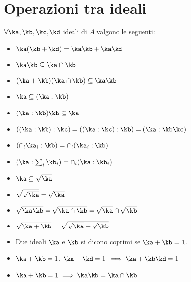 \documentclass[a4paper,NoNotes,GeneralMath]{stdmdoc}
\begin{document}
	\section*{Operazioni tra ideali}
	$\forall \ka, \kb, \kc, \kd$ ideali di $A$ valgono le seguenti:
	\begin{itemize}
		\item $\ka (\kb + \kd) = \ka \kb + \ka \kd$
		\item $\ka \kb \subseteq \ka \cap \kb$
		\item $(\ka + \kb)(\ka \cap \kb) \subseteq \ka \kb$
		\item $\ka \subseteq (\ka : \kb)$
		\item $(\ka : \kb)\kb \subseteq \ka$
		\item $((\ka : \kb) : \kc) = ((\ka : \kc) : \kb) = (\ka : \kb\kc)$
		\item $(\cap_i \ka_i : \kb) = \cap_i (\ka_i : \kb)$
		\item $(\ka : \sum_i \kb_i) = \cap_i (\ka : \kb_i)$
		\item $\ka \subseteq \sqrt{\ka}$
		\item $\sqrt{\sqrt{\ka}} = \sqrt{\ka}$
		\item $\sqrt{\ka \kb} = \sqrt{\ka \cap \kb} = \sqrt{\ka} \cap \sqrt{\kb}$
		\item $\sqrt{\ka + \kb} = \sqrt{\sqrt{\ka} + \sqrt{\kb}}$
		\item Due ideali $\ka$ e $\kb$ si dicono coprimi se $\ka + \kb = 1$.
		\item $\ka + \kb = 1$, $\ka + \kd = 1$ $\implies \ka + \kb\kd = 1$
		\item $\ka + \kb = 1 \implies \ka\kb = \ka \cap \kb$
	\end{itemize}
	
\end{document}
